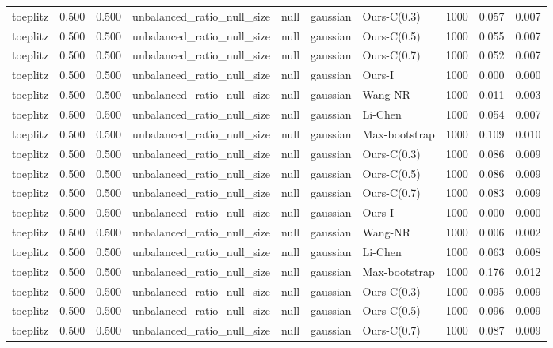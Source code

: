 \begin{tabular}{lrrllllrrr}
toeplitz & 0.500 & 0.500 & unbalanced\_ratio\_null\_size & null & gaussian & Ours-C(0.3) & 1000 & 0.057 & 0.007 \\
toeplitz & 0.500 & 0.500 & unbalanced\_ratio\_null\_size & null & gaussian & Ours-C(0.5) & 1000 & 0.055 & 0.007 \\
toeplitz & 0.500 & 0.500 & unbalanced\_ratio\_null\_size & null & gaussian & Ours-C(0.7) & 1000 & 0.052 & 0.007 \\
toeplitz & 0.500 & 0.500 & unbalanced\_ratio\_null\_size & null & gaussian & Ours-I & 1000 & 0.000 & 0.000 \\
toeplitz & 0.500 & 0.500 & unbalanced\_ratio\_null\_size & null & gaussian & Wang-NR & 1000 & 0.011 & 0.003 \\
toeplitz & 0.500 & 0.500 & unbalanced\_ratio\_null\_size & null & gaussian & Li-Chen & 1000 & 0.054 & 0.007 \\
toeplitz & 0.500 & 0.500 & unbalanced\_ratio\_null\_size & null & gaussian & Max-bootstrap & 1000 & 0.109 & 0.010 \\
toeplitz & 0.500 & 0.500 & unbalanced\_ratio\_null\_size & null & gaussian & Ours-C(0.3) & 1000 & 0.086 & 0.009 \\
toeplitz & 0.500 & 0.500 & unbalanced\_ratio\_null\_size & null & gaussian & Ours-C(0.5) & 1000 & 0.086 & 0.009 \\
toeplitz & 0.500 & 0.500 & unbalanced\_ratio\_null\_size & null & gaussian & Ours-C(0.7) & 1000 & 0.083 & 0.009 \\
toeplitz & 0.500 & 0.500 & unbalanced\_ratio\_null\_size & null & gaussian & Ours-I & 1000 & 0.000 & 0.000 \\
toeplitz & 0.500 & 0.500 & unbalanced\_ratio\_null\_size & null & gaussian & Wang-NR & 1000 & 0.006 & 0.002 \\
toeplitz & 0.500 & 0.500 & unbalanced\_ratio\_null\_size & null & gaussian & Li-Chen & 1000 & 0.063 & 0.008 \\
toeplitz & 0.500 & 0.500 & unbalanced\_ratio\_null\_size & null & gaussian & Max-bootstrap & 1000 & 0.176 & 0.012 \\
toeplitz & 0.500 & 0.500 & unbalanced\_ratio\_null\_size & null & gaussian & Ours-C(0.3) & 1000 & 0.095 & 0.009 \\
toeplitz & 0.500 & 0.500 & unbalanced\_ratio\_null\_size & null & gaussian & Ours-C(0.5) & 1000 & 0.096 & 0.009 \\
toeplitz & 0.500 & 0.500 & unbalanced\_ratio\_null\_size & null & gaussian & Ours-C(0.7) & 1000 & 0.087 & 0.009 \\

\end{tabular}
